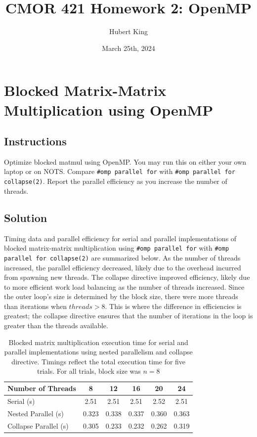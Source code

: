 \documentclass{article}
\title{CMOR 421 Homework 2: OpenMP}
\author{Hubert King}
\date{March 25th, 2024}
\begin{document}
\maketitle

\section{Blocked Matrix-Matrix Multiplication using OpenMP}
\subsection{Instructions}
Optimize blocked matmul using OpenMP. You may run this on either your own laptop or on NOTS. Compare \texttt{\#omp parallel for} with \texttt{\#omp parallel for collapse(2)}. Report the parallel efficiency as you increase the number of threads.
\subsection{Solution}

Timing data and parallel efficiency for serial and parallel implementations of blocked matrix-matrix multiplication using  \texttt{\#omp parallel for} with \texttt{\#omp parallel for collapse(2)} are summarized below. As the number of threads increased, the parallel efficiency decreased, likely due to the overhead incurred from spawning new threads. The collapse directive improved efficiency, likely due to more efficient work load balancing as the number of threads increased. Since the outer loop's size is determined by the block size, there were more threads than iterations when $threads > 8$. This is where the difference in efficiencies is greatest; the collapse directive ensures that the number of iterations in the loop is greater than the threads available.
\begin{table}[h!]
\centering
\begin{tabular}{@{}lccccc@{}}
\toprule
Number of Threads & 8 & 12 & 16 & 20 & 24 \\
\midrule
Serial (s) & 2.51 & 2.51 & 2.51 & 2.52 & 2.51 \\
Nested Parallel (s) & 0.323 & 0.338 & 0.337 & 0.360 & 0.363 \\
Collapse Parallel (s) & 0.305 & 0.233 & 0.232 & 0.262 & 0.319 \\
\bottomrule
\end{tabular}
\caption{Blocked matrix multiplication execution time for serial and parallel implementations using nested parallelism and collapse directive. Timings reflect the total execution time for five trials. For all trials, block size was $n = 8$}
\label{tab:matmul_times}
\end{table}
\end{document}
